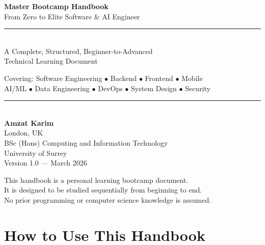 \documentclass[12pt, a4paper, oneside]{book}
\begin{document}
\begin{titlepage}
    \centering
    \vspace*{2cm}

    {\Huge\bfseries\color{primaryblue} Master Bootcamp Handbook\\[0.4cm]}
    {\LARGE\color{black!70} From Zero to Elite Software \& AI Engineer\\[1.5cm]}

    \rule{\textwidth}{1.5pt}\\[1cm]

    {\Large A Complete, Structured, Beginner-to-Advanced\\
    Technical Learning Document\\[0.5cm]}

    {\large Covering: Software Engineering $\bullet$ Backend $\bullet$ Frontend $\bullet$ Mobile\\
    AI/ML $\bullet$ Data Engineering $\bullet$ DevOps $\bullet$ System Design $\bullet$ Security\\[1.5cm]}

    \rule{\textwidth}{1.5pt}\\[2cm]

    {\Large\textbf{Amzat Karim}}\\[0.3cm]
    {\large London, UK}\\[0.2cm]
    {\large BSc (Hons) Computing and Information Technology}\\[0.2cm]
    {\large University of Surrey}\\[2cm]

    {\large\color{black!50} Version 1.0 — March 2026}

    \vfill
    {\small This handbook is a personal learning bootcamp document.\\
    It is designed to be studied sequentially from beginning to end.\\
    No prior programming or computer science knowledge is assumed.}
\end{titlepage}

\chapter*{How to Use This Handbook}
\end{document}
